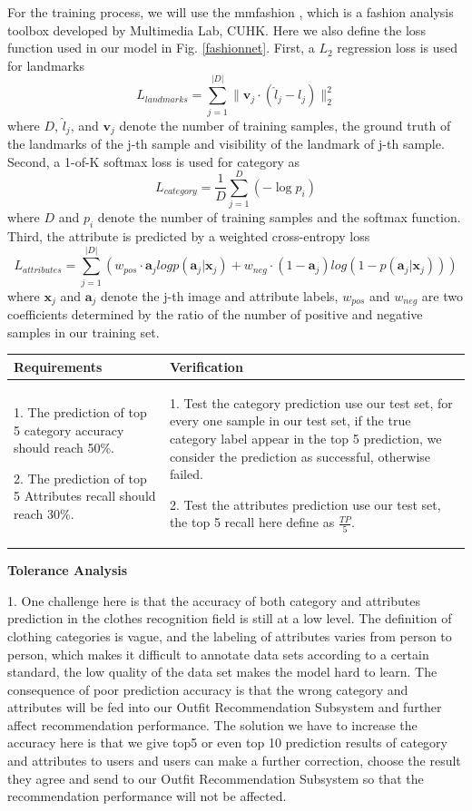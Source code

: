 For the training process, we will use the mmfashion \cite{mmfashion}, which is a fashion analysis toolbox developed by Multimedia Lab, CUHK. Here we also define the loss function used in our model in Fig. \ref{fashionnet}. First, a $L_2$ regression loss is used for landmarks $$L_{landmarks} = \sum_{j=1}^{|D|}\|\boldsymbol{v}_j\cdot(\hat{l}_j-l_j)\|_2^2$$ where $D$, $\hat{l}_j$, and $\boldsymbol{v}_j$ denote the number of training samples, the ground truth of the landmarks of the j-th sample and visibility of the landmark of j-th sample. Second, a 1-of-K softmax loss is used for category as $$L_{category}=\frac{1}{D}\sum_{j=1}^{D}(-\log{p_i})$$ where $D$ and ${p_i}$ denote the number of training samples and the softmax function. Third, the attribute is predicted by a weighted cross-entropy loss $$L_{attributes}=\sum_{j=1}^{|D|}(w_{pos}\cdot\boldsymbol{a}_jlog p(\boldsymbol{a}_j|\boldsymbol{x}_j)+w_{neg}\cdot(1-\boldsymbol{a}_j)log(1-p(\boldsymbol{a}_j|\boldsymbol{x}_j)))$$ where $\boldsymbol{x}_j$ and $\boldsymbol{a}_j$ denote the j-th image and attribute labels, $w_{pos}$ and $w_{neg}$ are two coefficients determined by the ratio of the number of positive and negative samples in our training set\cite{liu2016deepfashion}.  

\begin{table}[h]
    \centering
    \begin{tabularx}{\textwidth}{|X|X|}
    \hline
    Requirements & Verification \\
    \hline
    1. The prediction of top 5 category accuracy should reach 50\%.
    
    2. The prediction of top 5 Attributes recall should reach 30\%.
    & 
    1. Test the category prediction use our test set, for every one sample in our test set, if the true category label appear in the top 5 prediction, we consider the prediction as successful, otherwise failed.  
    
    2. Test the attributes prediction use our test set, the top 5 recall here define as $\frac{TP}{5}$.
    \\
    \hline
    \end{tabularx}
\end{table}

\noindent\textbf{Tolerance Analysis}  

1. One challenge here is that the accuracy of both category and attributes prediction in the clothes recognition field is still at a low level. The definition of clothing categories is vague, and the labeling of attributes varies from person to person, which makes it difficult to annotate data sets according to a certain standard, the low quality of the data set makes the model hard to learn. The consequence of poor prediction accuracy is that the wrong category and attributes will be fed into our Outfit Recommendation Subsystem and further affect recommendation performance. The solution we have to increase the accuracy here is that we give top5 or even top 10 prediction results of category and attributes to users and users can make a further correction, choose the result they agree and send to our Outfit Recommendation Subsystem so that the recommendation performance will not be affected.  

